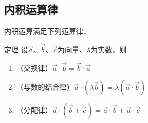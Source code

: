 \subsection{内积运算律}

内积运算满足下列运算律．

\begin{blk}{定理}
    设$\vec{a}$、$\vec{b}$、$\vec{c}$为向量、$\lambda$为实数，则
\begin{enumerate}
    \item （交换律）$\vec{a}\cdot \vec{b}=\vec{b}\cdot \vec{a}$
    \item （与数的结合律）$\vec{a}\cdot \left(\lambda\vec{b}\right)=\lambda\left(\vec{a}\cdot \vec{b}\right)$
    \item （分配律）$\vec{a}\cdot \left(\vec{b}+\vec{c}\right)=\vec{a}\cdot \vec{b}+\vec{a}\cdot \vec{c}$
\end{enumerate}
\end{blk}

